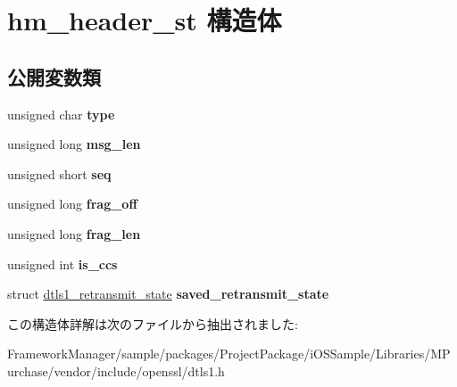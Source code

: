\hypertarget{structhm__header__st}{}\section{hm\+\_\+header\+\_\+st 構造体}
\label{structhm__header__st}
\subsection*{公開変数類}
\begin{DoxyCompactItemize}
\item 
\hypertarget{structhm__header__st_afd990f37440d11253dd4d6f1cb5f227e}{}unsigned char {\bfseries type}\label{structhm__header__st_afd990f37440d11253dd4d6f1cb5f227e}

\item 
\hypertarget{structhm__header__st_a0ad9536f7051da82c85e93cd61ac9f19}{}unsigned long {\bfseries msg\+\_\+len}\label{structhm__header__st_a0ad9536f7051da82c85e93cd61ac9f19}

\item 
\hypertarget{structhm__header__st_a724a245fd7883a93da6cf4d701654889}{}unsigned short {\bfseries seq}\label{structhm__header__st_a724a245fd7883a93da6cf4d701654889}

\item 
\hypertarget{structhm__header__st_a1971b139ea1f6985afdc19d548abe07a}{}unsigned long {\bfseries frag\+\_\+off}\label{structhm__header__st_a1971b139ea1f6985afdc19d548abe07a}

\item 
\hypertarget{structhm__header__st_aeabe85e8573ddb4dc5e662daf1d89285}{}unsigned long {\bfseries frag\+\_\+len}\label{structhm__header__st_aeabe85e8573ddb4dc5e662daf1d89285}

\item 
\hypertarget{structhm__header__st_a1443dd84e080fc01e0deabddc8974ec7}{}unsigned int {\bfseries is\+\_\+ccs}\label{structhm__header__st_a1443dd84e080fc01e0deabddc8974ec7}

\item 
\hypertarget{structhm__header__st_aa53c97a266f1246009cef42c434a6f22}{}struct \hyperlink{structdtls1__retransmit__state}{dtls1\+\_\+retransmit\+\_\+state} {\bfseries saved\+\_\+retransmit\+\_\+state}\label{structhm__header__st_aa53c97a266f1246009cef42c434a6f22}

\end{DoxyCompactItemize}


この構造体詳解は次のファイルから抽出されました\+:\begin{DoxyCompactItemize}
\item 
Framework\+Manager/sample/packages/\+Project\+Package/i\+O\+S\+Sample/\+Libraries/\+M\+Purchase/vendor/include/openssl/dtls1.\+h\end{DoxyCompactItemize}
